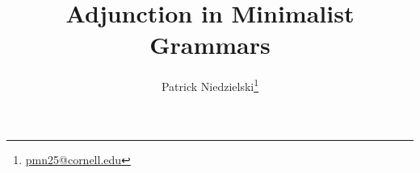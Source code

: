 \documentclass{article}
\title { Adjunction in Minimalist Grammars                             }
\author{ Patrick Niedzielski\footnote{
           \href{mailto:pmn25@cornell.edu}{pmn25@cornell.edu}
         }                                                             }
\begin{document}
\maketitle

\nocite{*}


\end{document}
